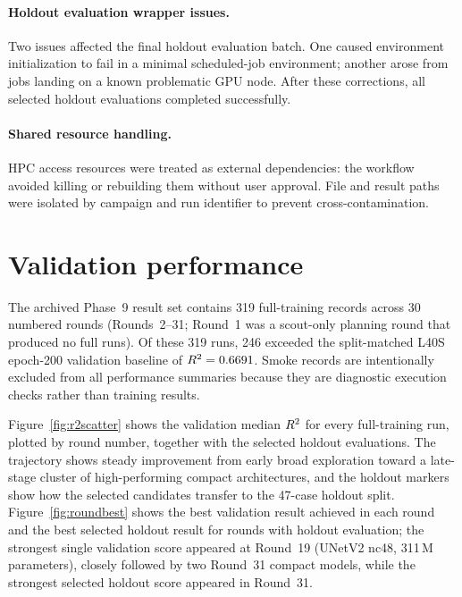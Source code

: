 ﻿\documentclass[preprint,12pt,authoryear]{elsarticle}
\newcommand{\rTwo}{R\textsuperscript{2}}
\begin{document}
\paragraph{Holdout evaluation wrapper issues.}
Two issues affected the final holdout evaluation batch.
One caused environment initialization to fail in a minimal scheduled-job environment; another arose from jobs landing on a known problematic GPU node.
After these corrections, all selected holdout evaluations completed successfully.

\paragraph{Shared resource handling.}
HPC access resources were treated as external dependencies: the workflow avoided killing or rebuilding them without user approval.
File and result paths were isolated by campaign and run identifier to prevent cross-contamination.

\section{Validation performance}
\label{sec:validation}

The archived Phase~9 result set contains 319 full-training records across 30 numbered rounds (Rounds~2--31; Round~1 was a scout-only planning round that produced no full runs).
Of these 319 runs, 246 exceeded the split-matched L40S epoch-200 validation baseline of $\rTwo{} = 0.6691$.
Smoke records are intentionally excluded from all performance summaries because they are diagnostic execution checks rather than training results.

Figure~\ref{fig:r2scatter} shows the validation median $\rTwo{}$ for every full-training run, plotted by round number, together with the selected holdout evaluations.
The trajectory shows steady improvement from early broad exploration toward a late-stage cluster of high-performing compact architectures, and the holdout markers show how the selected candidates transfer to the 47-case holdout split.
Figure~\ref{fig:roundbest} shows the best validation result achieved in each round and the best selected holdout result for rounds with holdout evaluation; the strongest single validation score appeared at Round~19 (UNetV2 nc48, 311\,M parameters), closely followed by two Round~31 compact models, while the strongest selected holdout score appeared in Round~31.
\end{document}
